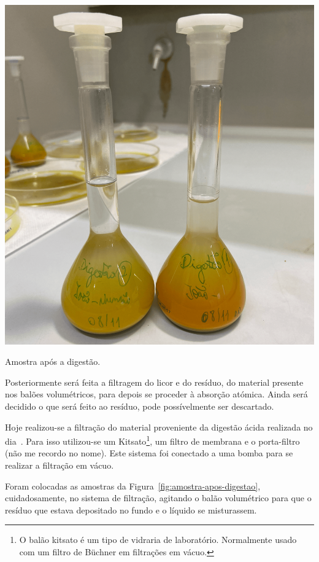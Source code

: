 \begin{marginfigure}[-3\baselineskip]
    \centering
    \includegraphics[width=0.8\linewidth]{figures/Amostra após Digestão}
    \caption{Amostra após a digestão.}
    \label{fig:amostra-apos-digestao}
\end{marginfigure}

Posteriormente será feita a filtragem do licor e do resíduo, do material presente nos balões volumétricos, para depois se proceder à absorção atómica.
Ainda será decidido o que será feito ao resíduo, pode possívelmente ser descartado.

\hrulefill


%



Hoje realizou-se a filtração do material proveniente da digestão ácida realizada no dia~.
Para isso utilizou-se um Kitsato\footnote{O balão kitsato é um tipo de vidraria de laboratório. Normalmente usado com um filtro de Büchner em filtrações em vácuo.}, um filtro de membrana e o porta-filtro (não me recordo no nome).
Este sistema foi conectado a uma bomba para se realizar a filtração em vácuo.

Foram colocadas as amostras da Figura~\ref{fig:amostra-apos-digestao}, cuidadosamente, no sistema de filtração, agitando o balão volumétrico para que o resíduo que estava depositado no fundo e o líquido se misturassem.

